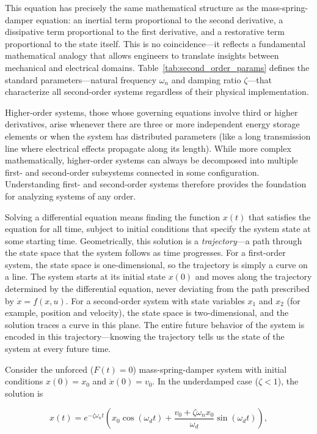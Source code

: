This equation has precisely the same mathematical structure as the mass-spring-damper equation: an inertial term proportional to the second derivative, a dissipative term proportional to the first derivative, and a restorative term proportional to the state itself. This is no coincidence—it reflects a fundamental mathematical analogy that allows engineers to translate insights between mechanical and electrical domains. Table~\ref{tab:second_order_params} defines the standard parameters—natural frequency $\omega_n$ and damping ratio $\zeta$—that characterize all second-order systems regardless of their physical implementation.

Higher-order systems, those whose governing equations involve third or higher derivatives, arise whenever there are three or more independent energy storage elements or when the system has distributed parameters (like a long transmission line where electrical effects propagate along its length). While more complex mathematically, higher-order systems can always be decomposed into multiple first- and second-order subsystems connected in some configuration. Understanding first- and second-order systems therefore provides the foundation for analyzing systems of any order.

Solving a differential equation means finding the function $x(t)$ that satisfies the equation for all time, subject to initial conditions that specify the system state at some starting time. Geometrically, this solution is a \emph{trajectory}—a path through the state space that the system follows as time progresses. For a first-order system, the state space is one-dimensional, so the trajectory is simply a curve on a line. The system starts at its initial state $x(0)$ and moves along the trajectory determined by the differential equation, never deviating from the path prescribed by $\dot{x} = f(x,u)$. For a second-order system with state variables $x_1$ and $x_2$ (for example, position and velocity), the state space is two-dimensional, and the solution traces a curve in this plane. The entire future behavior of the system is encoded in this trajectory—knowing the trajectory tells us the state of the system at every future time.

Consider the unforced ($F(t) = 0$) mass-spring-damper system with initial conditions $x(0) = x_0$ and $\dot{x}(0) = v_0$. In the underdamped case ($\zeta < 1$), the solution is

\begin{equation}
x(t) = e^{-\zeta \omega_n t} \left( x_0 \cos(\omega_d t) + \frac{v_0 + \zeta \omega_n x_0}{\omega_d} \sin(\omega_d t) \right),
\end{equation}

